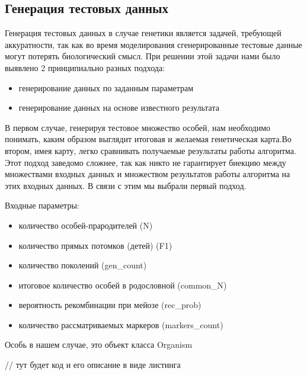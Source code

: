 \documentclass{matmex-diploma-custom}
\begin{document}
\subsection{Генерация тестовых данных}

Генерация тестовых данных в случае генетики является задачей,
требующей аккуратности, так как во время моделирования сгенерированные
тестовые данные могут потерять биологический смысл.  При решении
этой задачи нами было выявлено 2 принципиально разных подхода:

\begin{itemize}
\item генерирование данных по заданным параметрам
\item генерирование данных на основе известного результата
\end{itemize}

В первом случае, генерируя тестовое множество особей, нам необходимо
понимать, каким образом выглядит итоговая и желаемая генетическая
карта.Во втором, имея карту, легко сравнивать получаемые результаты
работы алгоритма. Этот подход заведомо сложнее, так как никто не
гарантирует биекцию между множествами входных данных и множеством
результатов работы алгоритма на этих входных данных.  В связи с этим
мы выбрали первый подход.

Входные параметры:
\begin{itemize}
\item количество особей-прародителей (N)
\item количество прямых потомков (детей) (F1)
\item количество поколений (gen\_count)
\item итоговое количество особей в родословной (common\_N)
\item вероятность рекомбинации при мейозе (rec\_prob) %
\item количество рассматриваемых маркеров (markers\_count)
\end{itemize}

Особь в нашем случае, это объект класса Organism

// тут будет код и его описание в виде листинга
\end{document}
